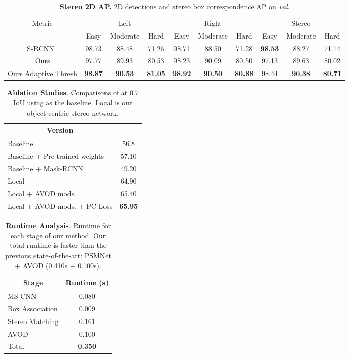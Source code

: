 \documentclass[letterpaper, 10 pt, conference]{ieeeconf}
\begin{document}
\begin{table*}[t!]
	\small
	\centering
	\tabcolsep=0.13cm
	\begin{tabular}{|c||ccc||ccc||ccc|}
		\hline
		\multirow{2}{*}{Metric}  & \multicolumn{3}{c||}{Left} & \multicolumn{3}{c||}{Right} & \multicolumn{3}{c|}{Stereo} \\
		& Easy & Moderate & Hard & Easy & Moderate & Hard & Easy & Moderate & Hard \\
		\hline
		S-RCNN~\cite{li2019stereo_rcnn} & 98.73 & 88.48 & 71.26 & 98.71 & 88.50 & 71.28 & \textbf{98.53} & 88.27 & 71.14 \\ \hline
		Ours     & 97.77 & 89.93 & 80.53 & 98.23 & 90.09 & 80.50 & 97.13 & 89.63 & 80.02 \\
		Ours Adaptive Thresh   & \textbf{98.87} & \textbf{90.53} & \textbf{81.05} & \textbf{98.92} & \textbf{90.50} & \textbf{80.88} & 98.44 & \textbf{90.38} & \textbf{80.71} \\ \hline
	\end{tabular}
	\caption{\textbf{Stereo 2D AP.} 2D detections and stereo box correspondence AP on \textit{val}.}
	\label{tab:kitti_2d_AP}
\end{table*}

\begin{table}[t!]
\centering
    \begin{tabular}{|l|c|}
		\hline
		\multicolumn{1}{|c|}{Version} &  \\
		\hline
		Baseline~\cite{wang2018pseudo} & 56.8  \\
		Baseline + Pre-trained weights &  57.10 \\
		Baseline + Mask-RCNN~\cite{he2017mask}   &  49.20 \\
		Local   &  64.90 \\
		Local + AVOD mods.  &  65.40 \\
		Local + AVOD mods. + PC Loss & \textbf{65.95} \\
		\hline
	\end{tabular}
   \caption{\textbf{Ablation Studies}. Comparisons of  at 0.7 IoU using \cite{wang2018pseudo} as the baseline. Local is our object-centric stereo network.}
   \label{tab:ablation}
\end{table}

\begin{table}[t!]
\centering
   \begin{tabular}{|l|c|}
		\hline
		\multicolumn{1}{|c|}{Stage} & Runtime (s) \\
		\hline
		MS-CNN~\cite{cai_mscnn}   & 0.080 \\
		Box Association & 0.009 \\ 
		Stereo Matching & 0.161  \\
		AVOD~\cite{ku_avod}  & 0.100 \\
		\hline
		Total & \textbf{0.350} \\
		\hline
	\end{tabular}
   \caption{\textbf{Runtime Analysis}. Runtime for each stage of our method. Our total runtime is faster than the previous state-of-the-art: PSMNet + AVOD (0.410s + 0.100s).}
   \label{tab:runtime}
\end{table}
\end{document}
